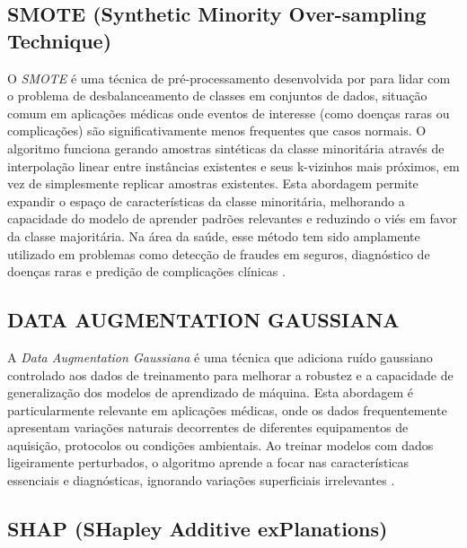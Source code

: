 \documentclass[12pt, a4paper]{report}
\theoremstyle{definition}
\theoremstyle{remark}
\theoremstyle{plain}
\begin{document}
 \subsection{SMOTE (Synthetic Minority Over-sampling Technique)}

 O \textit{SMOTE} é uma técnica de pré-processamento desenvolvida por \textcite{Chawla2002} para lidar com o problema de desbalanceamento de classes em conjuntos de dados, situação comum em aplicações médicas onde eventos de interesse (como doenças raras ou complicações) são significativamente menos frequentes que casos normais. O algoritmo funciona gerando amostras sintéticas da classe minoritária através de interpolação linear entre instâncias existentes e seus k-vizinhos mais próximos, em vez de simplesmente replicar amostras existentes. Esta abordagem permite expandir o espaço de características da classe minoritária, melhorando a capacidade do modelo de aprender padrões relevantes e reduzindo o viés em favor da classe majoritária. Na área da saúde, esse método tem sido amplamente utilizado em problemas como detecção de fraudes em seguros, diagnóstico de doenças raras e predição de complicações clínicas \cite{Elreedy2019}.

\subsection{DATA AUGMENTATION GAUSSIANA}

A \textit{Data Augmentation Gaussiana} é uma técnica que adiciona ruído gaussiano controlado aos dados de treinamento para melhorar a robustez e a capacidade de generalização dos modelos de aprendizado de máquina. Esta abordagem é particularmente relevante em aplicações médicas, onde os dados frequentemente apresentam variações naturais decorrentes de diferentes equipamentos de aquisição, protocolos ou condições ambientais. Ao treinar modelos com dados ligeiramente perturbados, o algoritmo aprende a focar nas características essenciais e diagnósticas, ignorando variações superficiais irrelevantes \cite{Beinecke2021, Chlap2021}.

\subsection{SHAP (SHapley Additive exPlanations)}
\end{document}
